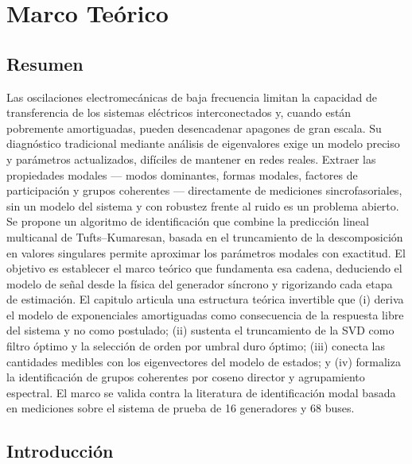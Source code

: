 \chapter{Marco Teórico}

\section*{Resumen}
Las oscilaciones electromecánicas de baja frecuencia limitan la capacidad
de transferencia de los sistemas eléctricos interconectados y, cuando están
pobremente amortiguadas, pueden desencadenar apagones de gran escala. Su
diagnóstico tradicional mediante análisis de eigenvalores exige un modelo
preciso y parámetros actualizados, difíciles de mantener en redes
reales. Extraer las propiedades modales --- modos
dominantes, formas modales, factores de participación y grupos coherentes
--- directamente de mediciones sincrofasoriales, sin un modelo del sistema y
con robustez frente al ruido es un problema abierto. Se propone un algoritmo de
identificación que combine la predicción lineal multicanal de
Tufts--Kumaresan, basada en el truncamiento de la descomposición en
valores singulares permite aproximar los parámetros modales con exactitud. El objetivo es 
establecer el marco teórico que fundamenta esa cadena, deduciendo el modelo de señal desde 
la física del generador síncrono y rigorizando cada etapa de estimación. El capitulo
articula una estructura teórica invertible que (i) deriva el modelo de
exponenciales amortiguadas como consecuencia de la respuesta libre del
sistema y no como postulado; (ii) sustenta el truncamiento de la SVD como
filtro óptimo y la selección de orden por umbral duro óptimo; (iii) conecta
las cantidades medibles con los eigenvectores del modelo de estados; y (iv)
formaliza la identificación de grupos coherentes por coseno director y
agrupamiento espectral. El marco se valida contra la literatura de
identificación modal basada en mediciones sobre el sistema de prueba de
16 generadores y 68 buses.



\section{Introducción}

